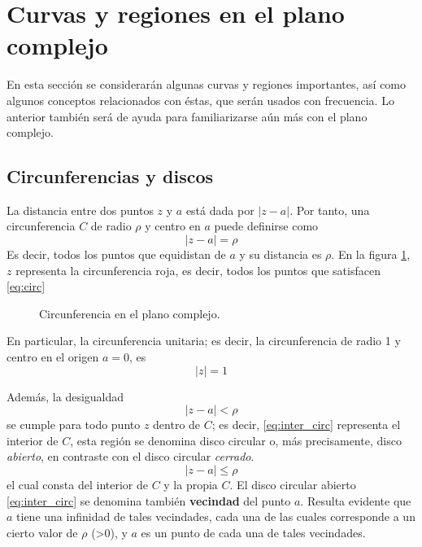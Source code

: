 \section{Curvas y regiones en el plano complejo}

En esta sección se considerarán algunas curvas y regiones importantes, así como algunos conceptos relacionados con éstas, que serán usados con frecuencia. Lo anterior también será de ayuda para familiarizarse aún más con el plano complejo.

\subsection{Circunferencias y discos}

La distancia entre dos puntos $z$ y $a$ está dada por $\lvert z-a \rvert$. Por tanto, una circunferencia $C$ de radio $\rho$ y centro en $a$ puede definirse como
\begin{equation}
  \lvert z-a \rvert = \rho
  \label{eq:circ}
\end{equation}
Es decir, todos los puntos que equidistan de $a$ y su distancia es $\rho$. En la figura \ref{fig:circ_compx}, $z$ representa la circunferencia roja, es decir, todos los puntos que satisfacen \ref{eq:circ}
\begin{figure}[ht]
  \centering
  \caption{Circunferencia en el plano complejo.}
  \label{fig:circ_compx}
\end{figure}

En particular, la circunferencia unitaria; es decir, la circunferencia de radio 1 y centro en el origen $a=0$, es
\begin{equation*}
  \lvert z \rvert = 1
\end{equation*}

Además, la desigualdad
\begin{equation}
  \lvert z - a \rvert < \rho
  \label{eq:inter_circ}
\end{equation}
se cumple para todo punto $z$ dentro de $C$; es decir, \ref{eq:inter_circ} representa el interior de $C$, esta región se denomina disco circular o, más precisamente, disco \textit{abierto}, en contraste con el disco circular \textit{cerrado}.
\begin{equation*}
  \lvert z-a \rvert \leqslant \rho
\end{equation*}
el cual consta del interior de $C$ y la propia $C$. El disco circular abierto \ref{eq:inter_circ} se denomina también \textbf{vecindad} del punto $a$. Resulta evidente que $a$ tiene una infinidad de tales vecindades, cada una de las cuales corresponde a un cierto valor de $\rho$ (>0), y $a$ es un punto de cada una de tales vecindades.
\label{word:vecindad}

